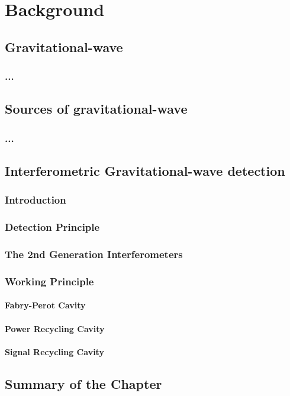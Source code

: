\chapter{Background}
\section{Gravitational-wave}
\subsection{...}
\section{Sources of gravitational-wave}
\subsection{...}
\section{Interferometric Gravitational-wave detection} \label{sec:13}
\subsection{Introduction}
\subsection{Detection Principle}
\subsection{The 2nd Generation Interferometers}
\subsection{Working Principle}
\subsubsection{Fabry-Perot Cavity}
\subsubsection{Power Recycling Cavity}
\subsubsection{Signal Recycling Cavity}
\section{Summary of the Chapter}
